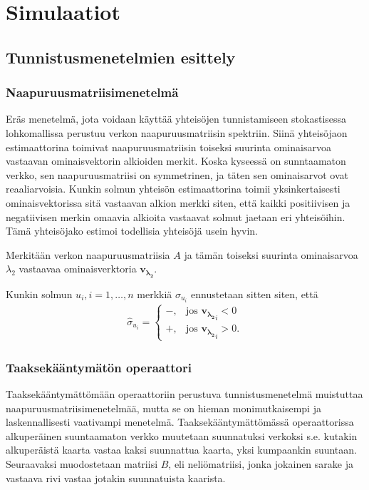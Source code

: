 \documentclass[finnish,12pt,a4paper,pdftex,sci,utf8]{aaltothesis}
\begin{document}
\section{Simulaatiot}
\subsection{Tunnistusmenetelmien esittely}
\subsubsection{Naapuruusmatriisimenetelmä}
Eräs menetelmä, jota voidaan käyttää yhteisöjen tunnistamiseen stokastisessa lohkomallissa perustuu verkon naapuruusmatriisin spektriin. Siinä yhteisöjaon estimaattorina toimivat naapuruusmatriisin toiseksi suurinta ominaisarvoa vastaavan ominaisvektorin alkioiden merkit. Koska kyseessä on sunntaamaton verkko, sen naapuruusmatriisi on symmetrinen, ja täten sen ominaisarvot ovat reaaliarvoisia. Kunkin solmun yhteisön estimaattorina toimii yksinkertaisesti ominaisvektorissa sitä vastaavan alkion merkki siten, että kaikki positiivisen ja negatiivisen merkin omaavia alkioita vastaavat solmut jaetaan eri yhteisöihin. Tämä yhteisöjako estimoi todellisia yhteisöjä usein hyvin.

Merkitään verkon naapuruusmatriisia $A$ ja tämän toiseksi suurinta ominaisarvoa $\lambda_2$ vastaavaa ominaisverktoria $\mathbf{v_{\lambda_2}}$.

Kunkin solmun $u_i, i = 1, \ldots, n$ merkkiä $\sigma_{u_i}$ ennustetaan sitten siten, että
\begin{align*}
	\hat{\sigma}_{u_i} =
	\begin{cases}
		-, & \text{jos } \mathbf{v_{\lambda_2}}_i < 0 \\
		+, & \text{jos } \mathbf{v_{\lambda_2}}_i > 0.
	\end{cases}
\end{align*}

\subsubsection{Taaksekääntymätön operaattori}
Taaksekääntymättömään operaattoriin perustuva tunnistusmenetelmä muistuttaa naapuruusmatriisimenetelmää, mutta se on hieman monimutkaisempi ja laskennallisesti vaativampi menetelmä. Taaksekääntymättömässä operaattorissa alkuperäinen suuntaamaton verkko muutetaan suunnatuksi verkoksi s.e. kutakin alkuperäistä kaarta vastaa kaksi suunnattua kaarta, yksi kumpaankin suuntaan. Seuraavaksi muodostetaan matriisi $B$, eli neliömatriisi, jonka jokainen sarake ja vastaava rivi vastaa jotakin suunnatuista kaarista.
\end{document}

